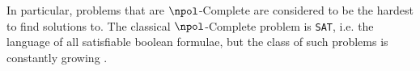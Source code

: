 \documentclass{article}
\begin{document}
In particular, problems that are $\npol$-Complete are considered to be the hardest to find solutions to. The classical $\npol$-Complete problem is \texttt{SAT}, i.e. the language of all satisfiable boolean formulae, but the class of such problems is constantly growing \cite{karpReducibilityCombinatorialProblems1972}.




\end{document}
